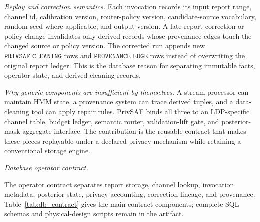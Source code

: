 \documentclass[conference]{IEEEtran}
\begin{document}
\noindent\emph{Replay and correction semantics.}
Each invocation records its input report range, channel id, calibration version, router-policy version, candidate-source vocabulary, random seed where applicable, and output version. A late report correction or policy change invalidates only derived records whose provenance edges touch the changed source or policy version. The corrected run appends new \(\texttt{PRIVSAF\_CLEANING}\) rows and \(\texttt{PROVENANCE\_EDGE}\) rows instead of overwriting the original report ledger. This is the database reason for separating immutable facts, operator state, and derived cleaning records.

\noindent\emph{Why generic components are insufficient by themselves.}
A stream processor can maintain HMM state, a provenance system can trace derived tuples, and a data-cleaning tool can apply repair rules. PrivSAF binds all three to an LDP-specific channel table, budget ledger, semantic router, validation-lift gate, and posterior-mask aggregate interface. The contribution is the reusable contract that makes these pieces replayable under a declared privacy mechanism while retaining a conventional storage engine.

\noindent\emph{Database operator contract.}
\label{ssec:db_operator_contract}

The operator contract separates report storage, channel lookup, invocation metadata, posterior state, privacy accounting, correction lineage, and provenance. Table~\ref{tab:db_contract} gives the main contract components; complete SQL schemas and physical-design scripts remain in the artifact.
\end{document}
